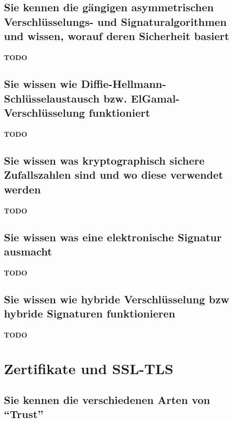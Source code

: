 \documentclass[10pt,a4paper]{article}
\begin{document}
\subsection*{Sie kennen die gängigen asymmetrischen Verschlüsselungs- und Signaturalgorithmen und wissen, worauf deren Sicherheit basiert}
\paragraph*{TODO}
\subsection*{Sie wissen wie Diffie-Hellmann-Schlüsselaustausch bzw. ElGamal-Verschlüsselung funktioniert}
\paragraph*{TODO}
\subsection*{Sie wissen was kryptographisch sichere Zufallszahlen sind und wo diese verwendet werden}
\paragraph*{TODO}
\subsection*{Sie wissen was eine elektronische Signatur ausmacht}
\paragraph*{TODO}
\subsection*{Sie wissen wie hybride Verschlüsselung bzw hybride Signaturen funktionieren}
\paragraph*{TODO}


\section{Zertifikate und SSL-TLS}
\subsection*{Sie kennen die verschiedenen Arten von "`Trust"'}
\end{document}
